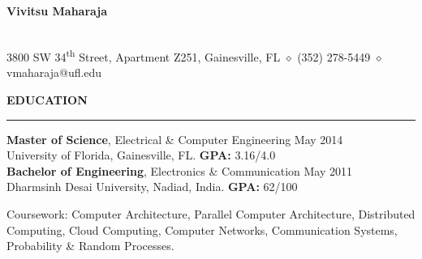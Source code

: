 \documentclass[10pt, a4paper]{article}
\begin{document}
\begin{center}
{\Large \bf Vivitsu Maharaja}
\date{}
\thispagestyle{empty}
\smallskip \\
3800 SW 34\textsuperscript{th} Street, Apartment Z251, Gainesville, FL $\diamond$ (352) 278-5449 $\diamond$ vmaharaja@ufl.edu
\end{center}



\MakeUppercase{\bf Education}
\smallskip
\hrule
{\bf Master of Science}, Electrical \& Computer Engineering \hfill May 2014\\
University of Florida, Gainesville, FL. {\bf GPA:} 3.16/4.0 \\
{\bf Bachelor of Engineering}, Electronics \& Communication \hfill May 2011\\
Dharmsinh Desai University, Nadiad, India. {\bf GPA:} 62/100

Coursework: Computer Architecture, Parallel Computer Architecture, Distributed Computing, Cloud Computing, Computer Networks, Communication Systems, Probability \& Random Processes.
\end{document}
